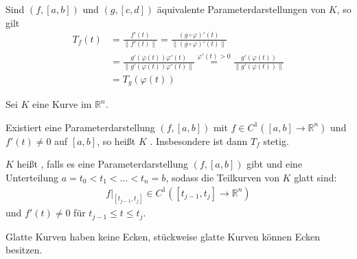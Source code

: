 \begin{theorem}[Satz]
  Sind $(f,[a,b])$ und $(g,[c,d])$ äquivalente Parameterdarstellungen von $K$, so gilt
  \begin{align*}
    T_f(t) &= \frac{f'(t)}{\|f'(t)\|} = \frac{(g \circ \varphi)'(t)}{\|(g \circ \varphi)'(t)\|} \\
    &= \frac{g'(\varphi(t)) \varphi'(t)}{\|g'(\varphi(t)) \varphi'(t)\|} \overset{\varphi'(t) > 0}{=} \frac{g'(\varphi(t))}{\|g'(\varphi(t))\|} \\
    &= T_g(\varphi(t))
  \end{align*}
\end{theorem}

\begin{theorem}[Definition]
  Sei $K$ eine Kurve im $\mathbb{R}^n$.
  \begin{enum-arab}
    \item Existiert eine Parameterdarstellung $(f,[a,b])$ mit $f \in C^1([a,b] \to \mathbb{R}^n)$ und $f'(t) \neq 0$ auf $[a,b]$, so heißt $K$ . Insbesondere ist dann $T_f$ stetig.
    
    \item $K$ heißt , falls es eine Parameterdarstellung $(f,[a,b])$ gibt und eine Unterteilung $a=t_0 < t_1 < \ldots < t_n=b$, sodass die Teilkurven von $K$ glatt sind:
    \begin{align*}
      f\Big|_{[t_{j-1},t_j]} \in C^1([t_{j-1},t_j] \to \mathbb{R}^n)
    \end{align*}
    und $f'(t) \neq 0$ für $t_{j-1} \leq t \leq t_j$.
  \end{enum-arab}
\end{theorem}

\begin{notice}
  Glatte Kurven haben keine Ecken, stückweise glatte Kurven können Ecken besitzen.
\end{notice}


